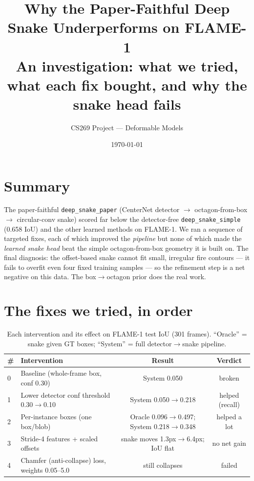 \documentclass[10pt]{article}
\title{\vspace{-2.5em}Why the Paper-Faithful Deep Snake Underperforms on FLAME-1\\
\large An investigation: what we tried, what each fix bought, and why the snake head fails}
\author{CS269 Project --- Deformable Models}
\date{\today}
\begin{document}
\maketitle
\vspace{-1.5em}

\section{Summary}

The paper-faithful \texttt{deep\_snake\_paper} (CenterNet detector $\to$
octagon-from-box $\to$ circular-conv snake) scored far below the detector-free
\texttt{deep\_snake\_simple} (0.658 IoU) and the other learned methods on FLAME-1.
We ran a sequence of targeted fixes, each of which improved the \emph{pipeline}
but none of which made the \emph{learned snake head} beat the simple
octagon-from-box geometry it is built on. The final diagnosis: the offset-based
snake cannot fit small, irregular fire contours --- it fails to overfit even four
fixed training samples --- so the refinement step is a net negative on this data.
The box$\to$octagon prior does the real work.

\section{The fixes we tried, in order}

\begin{table}[H]
\centering
\caption{Each intervention and its effect on FLAME-1 test IoU (301 frames).
``Oracle'' = snake given GT boxes; ``System'' = full detector$\to$snake pipeline.}
\begin{tabular}{llcc}
\toprule
\# & Intervention & Result & Verdict \\
\midrule
0 & Baseline (whole-frame box, conf 0.30)       & System 0.050 & broken \\
1 & Lower detector conf threshold 0.30$\to$0.10 & System 0.050$\to$0.218 & helped (recall) \\
2 & Per-instance boxes (one box/blob)           & Oracle 0.096$\to$0.497; System 0.218$\to$0.348 & helped a lot \\
3 & Stride-4 features + scaled offsets          & snake moves 1.3px$\to$6.4px; IoU flat & no net gain \\
4 & Chamfer (anti-collapse) loss, weights 0.05--5.0 & still collapses & failed \\
\bottomrule
\end{tabular}
\end{table}
\end{document}
